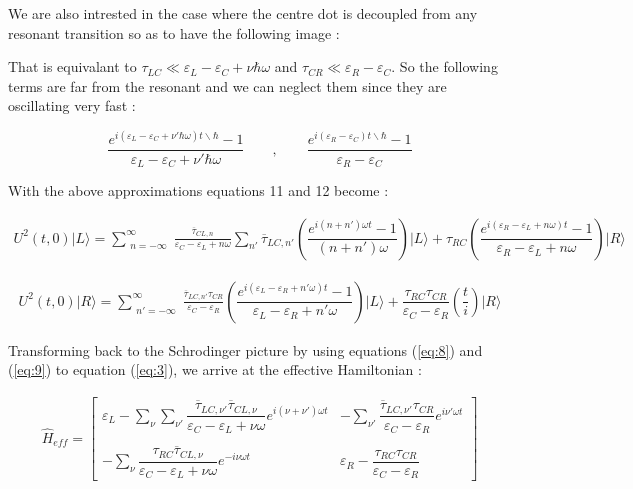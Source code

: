 We are also intrested in the case where the centre dot is decoupled from any resonant transition so as to have the following image : 

That is equivalant to $\tau_{LC} \ll \varepsilon_L-\varepsilon_C +\nu \hbar \omega$ and $\tau_{CR} \ll \varepsilon_R-\varepsilon_C$. So the following terms are far from the resonant and we can neglect them since they are oscillating very fast : 

\begin{equation} \label{eq:7}
 \dfrac{ e^{i ( \varepsilon_L - \varepsilon_C + \nu' \hbar \omega ) t \backslash \hbar } - 1 } { \varepsilon_L - \varepsilon_C + \nu' \hbar \omega  } \qquad  , \qquad
 \dfrac{ e^{i ( \varepsilon_R - \varepsilon_C )  t \backslash \hbar   } - 1 } { \varepsilon_R - \varepsilon_C}
 \end{equation}
 
  
With the above approximations equations 11 and 12 become :
 
 \begin{multline} \label{eq:8}
U^{2}(t,0) \vert L \rangle =  \sum_{\substack{n=-\infty}}^{\infty} \frac{\overline{\tau}_{CL,n} } { \varepsilon_C -\varepsilon_L + n \omega } 
  \sum_{n'} \overline{\tau}_{LC,n'} \left(  \dfrac{ e^{ i (n+n')\omega t } -1}{ ( n+n' ) \omega } \right)    \vert L \rangle 
+\tau_{RC} \left(  \dfrac{ e^{i ( \varepsilon_R - \varepsilon_L + n \omega )  t } - 1 } { \varepsilon_R - \varepsilon_L + n \omega  } \right)  \vert R \rangle 
\end{multline}

\begin{multline} \label{eq:9}
U^{2}(t,0) \vert R \rangle = \sum_{\substack{n'=-\infty}}^{\infty} \frac{\overline{\tau}_{LC,n'} {\tau}_{CR}  } { \varepsilon_C -\varepsilon_R }  \left(  \dfrac{ e^{i ( \varepsilon_L - \varepsilon_R + n'\omega ) t } - 1 } { \varepsilon_L - \varepsilon_R + n'  \omega  } \right)    \vert L \rangle 
+ \dfrac{ \tau_{RC} \tau_{CR} }{ \varepsilon_C - \varepsilon_R } \left(  \dfrac{t}{i} \right)  \vert R \rangle 
\end{multline}


Transforming back to the Schrodinger picture by using equations (\ref{eq:8}) and (\ref{eq:9}) to equation (\ref{eq:3}), we arrive at the effective Hamiltonian : 

\begin{multline} \label{eq:10}
\widehat{H}_{eff}= \begin{bmatrix}
\varepsilon_L - \sum_{\nu} \sum_{\nu'} {\dfrac { \overline{\tau}_{LC,\nu'} \overline{\tau}_{CL,\nu} } {\varepsilon_C - \varepsilon_L + \nu \omega} e^{ i (\nu+\nu')\omega t } }
& -\sum_{\nu'} { \dfrac{  \overline{\tau}_{LC,\nu'} {\tau}_{CR} } {\varepsilon_C - \varepsilon_R} e^{ i \nu'\omega t }}
\\
\\
-\sum_{\nu}{\dfrac{ {\tau}_{RC} \overline{\tau}_{CL,\nu}  } {\varepsilon_C - \varepsilon_L + \nu \omega } e^{ -i \nu\omega t }} 
& \varepsilon_R - \dfrac{\tau_{RC} \tau_{CR} }{ \varepsilon_C - \varepsilon_ R }
\end{bmatrix} 
\end{multline}

